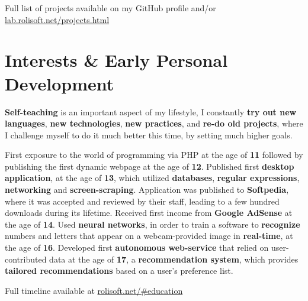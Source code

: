 \documentclass[11pt,a4paper,sans]{moderncv}
\renewcommand*{\httplink}[2][]{%
	\ifthenelse{\equal{#1}{}}%
	{\href{https://#2}{#2}}%
	{\href{https://#2}{#1}}}
\begin{document}
	{\small Full list of projects available on my GitHub profile and/or \httplink{lab.rolisoft.net/projects.html}}

\section{Interests \& Early Personal Development}

	{\small \textbf{Self-teaching} is an important aspect of my lifestyle, I constantly \textbf{try out new languages}, \textbf{new technologies}, \textbf{new practices}, and \textbf{re-do old projects}, where I challenge myself to do it much better this time, by setting much higher goals.}
	
	\vspace{6pt}

	{\small First exposure to the world of programming via PHP at the age of \textbf{11} followed by publishing the first dynamic webpage at the age of \textbf{12}. Published first \textbf{desktop application}, at the age of \textbf{13}, which utilized \textbf{databases}, \textbf{regular expressions}, \textbf{networking} and \textbf{screen-scraping}. Application was published to \textbf{Softpedia}, where it was accepted and reviewed by their staff, leading to a few hundred downloads during its lifetime. Received first income from \textbf{Google AdSense} at the age of \textbf{14}. Used \textbf{neural networks}, in order to train a software to \textbf{recognize} numbers and letters that appear on a webcam-provided image in \textbf{real-time}, at the age of \textbf{16}. Developed first \textbf{autonomous web-service} that relied on user-contributed data at the age of \textbf{17}, a \textbf{recommendation system}, which provides \textbf{tailored recommendations} based on a user's preference list.

	\vspace{6pt}

	Full timeline available at \httplink{rolisoft.net/\#education}}
\end{document}
